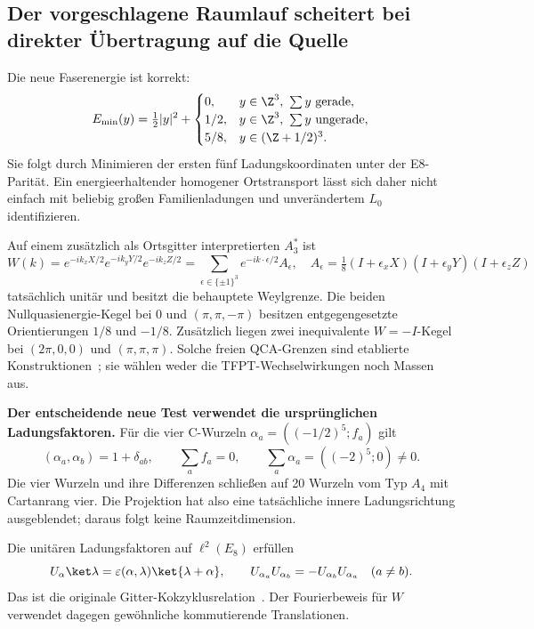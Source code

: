 \subsection{Der vorgeschlagene Raumlauf scheitert bei direkter Übertragung auf die Quelle}
Die neue Faserenergie ist korrekt:
\begin{equation}
E_{\min}(y)=\tfrac12|y|^2+
\begin{cases}
0,&y\in\Z^3,\ \sum y\text{ gerade},\\
1/2,&y\in\Z^3,\ \sum y\text{ ungerade},\\
5/8,&y\in(\Z+1/2)^3.
\end{cases}
\end{equation}
Sie folgt durch Minimieren der ersten fünf Ladungskoordinaten unter der E8-Parität. Ein energieerhaltender homogener Ortstransport lässt sich daher nicht einfach mit beliebig großen Familienladungen und unverändertem $L_0$ identifizieren.

Auf einem zusätzlich als Ortsgitter interpretierten $A_3^*$ ist
\begin{equation}
W(k)=e^{-ik_xX/2}e^{-ik_yY/2}e^{-ik_zZ/2}
=\sum_{\epsilon\in\{\pm1\}^3}e^{-ik\cdot\epsilon/2}A_\epsilon,
\quad A_\epsilon=\tfrac18(I+\epsilon_xX)(I+\epsilon_yY)(I+\epsilon_zZ)
\end{equation}
tatsächlich unitär und besitzt die behauptete Weylgrenze. Die beiden Nullquasienergie-Kegel bei $0$ und $(\pi,\pi,-\pi)$ besitzen entgegengesetzte Orientierungen $1/8$ und $-1/8$. Zusätzlich liegen zwei inequivalente $W=-I$-Kegel bei $(2\pi,0,0)$ und $(\pi,\pi,\pi)$. Solche freien QCA-Grenzen sind etablierte Konstruktionen~\cite{darianojo}; sie wählen weder die TFPT-Wechselwirkungen noch Massen aus.

\textbf{Der entscheidende neue Test verwendet die ursprünglichen Ladungsfaktoren.}
Für die vier C-Wurzeln $\alpha_a=((-1/2)^5;f_a)$ gilt
\begin{equation}
(\alpha_a,\alpha_b)=1+\delta_{ab},\qquad
\sum_a f_a=0,\qquad \sum_a\alpha_a=((-2)^5;0)\ne0.
\end{equation}
Die vier Wurzeln und ihre Differenzen schließen auf 20 Wurzeln vom Typ $A_4$ mit Cartanrang vier. Die Projektion hat also eine tatsächliche innere Ladungsrichtung ausgeblendet; daraus folgt keine Raumzeitdimension.

Die unitären Ladungsfaktoren auf $\ell^2(E_8)$ erfüllen
\begin{equation}
U_\alpha\ket\lambda=\varepsilon(\alpha,\lambda)\ket{\lambda+\alpha},
\qquad U_{\alpha_a}U_{\alpha_b}=-U_{\alpha_b}U_{\alpha_a}\quad(a\ne b).
\end{equation}
Das ist die originale Gitter-Kokzyklusrelation~\cite{dongnagjoint}. Der Fourierbeweis für $W$ verwendet dagegen gewöhnliche kommutierende Translationen.

